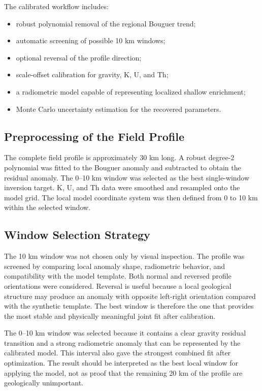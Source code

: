 \documentclass[12pt,a4paper]{article}
\begin{document}
The calibrated workflow includes:
\begin{itemize}
    \item robust polynomial removal of the regional Bouguer trend;
    \item automatic screening of possible 10 km windows;
    \item optional reversal of the profile direction;
    \item scale-offset calibration for gravity, K, U, and Th;
    \item a radiometric model capable of representing localized shallow enrichment;
    \item Monte Carlo uncertainty estimation for the recovered parameters.
\end{itemize}

\subsection{Preprocessing of the Field Profile}
The complete field profile is approximately 30 km long. A robust degree-2 polynomial was fitted to the Bouguer anomaly and subtracted to obtain the residual anomaly. The 0--10 km window was selected as the best single-window inversion target. K, U, and Th data were smoothed and resampled onto the model grid. The local model coordinate system was then defined from 0 to 10 km within the selected window.

\subsection{Window Selection Strategy}
The 10 km window was not chosen only by visual inspection. The profile was screened by comparing local anomaly shape, radiometric behavior, and compatibility with the model template. Both normal and reversed profile orientations were considered. Reversal is useful because a local geological structure may produce an anomaly with opposite left-right orientation compared with the synthetic template. The best window is therefore the one that provides the most stable and physically meaningful joint fit after calibration.

The 0--10 km window was selected because it contains a clear gravity residual transition and a strong radiometric anomaly that can be represented by the calibrated model. This interval also gave the strongest combined fit after optimization. The result should be interpreted as the best local window for applying the model, not as proof that the remaining 20 km of the profile are geologically unimportant.
\end{document}
